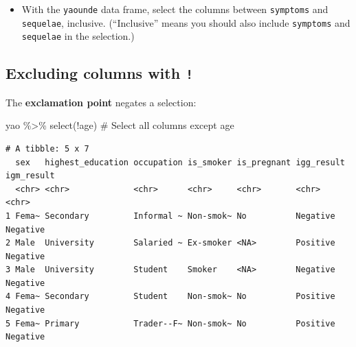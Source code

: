 \documentclass[
  letterpaper,
  DIV=11,
  numbers=noendperiod]{scrreprt}
\newenvironment{Shaded}{\begin{snugshade}}{\end{snugshade}}
\newcommand{\CommentTok}[1]{\textcolor[rgb]{0.37,0.37,0.37}{#1}}
\newcommand{\FunctionTok}[1]{\textcolor[rgb]{0.28,0.35,0.67}{#1}}
\newcommand{\NormalTok}[1]{\textcolor[rgb]{0.00,0.23,0.31}{#1}}
\newcommand{\SpecialCharTok}[1]{\textcolor[rgb]{0.37,0.37,0.37}{#1}}
\providecommand{\tightlist}{%
  \setlength{\itemsep}{0pt}\setlength{\parskip}{0pt}}\usepackage{longtable,booktabs,array}
\begin{document}
\begin{tcolorbox}[enhanced jigsaw, title=\textcolor{quarto-callout-tip-color}{\faLightbulb}\hspace{0.5em}{Practice}, colbacktitle=quarto-callout-tip-color!10!white, leftrule=.75mm, arc=.35mm, opacityback=0, bottomrule=.15mm, rightrule=.15mm, toptitle=1mm, breakable, toprule=.15mm, colback=white, coltitle=black, colframe=quarto-callout-tip-color-frame, bottomtitle=1mm, titlerule=0mm, left=2mm, opacitybacktitle=0.6]

\begin{itemize}
\tightlist
\item
  With the \texttt{yaounde} data frame, select the columns between
  \texttt{symptoms} and \texttt{sequelae}, inclusive. (``Inclusive''
  means you should also include \texttt{symptoms} and \texttt{sequelae}
  in the selection.)
\end{itemize}

\end{tcolorbox}

\subsection{\texorpdfstring{Excluding columns with
\texttt{!}}{Excluding columns with !}}\label{excluding-columns-with}

The \textbf{exclamation point} negates a selection:

\begin{Shaded}
\begin{Highlighting}[]
\NormalTok{yao }\SpecialCharTok{\%\textgreater{}\%} \FunctionTok{select}\NormalTok{(}\SpecialCharTok{!}\NormalTok{age) }\CommentTok{\# Select all columns except \textasciigrave{}age\textasciigrave{}}
\end{Highlighting}
\end{Shaded}

\begin{verbatim}
# A tibble: 5 x 7
  sex   highest_education occupation is_smoker is_pregnant igg_result igm_result
  <chr> <chr>             <chr>      <chr>     <chr>       <chr>      <chr>     
1 Fema~ Secondary         Informal ~ Non-smok~ No          Negative   Negative  
2 Male  University        Salaried ~ Ex-smoker <NA>        Positive   Negative  
3 Male  University        Student    Smoker    <NA>        Negative   Negative  
4 Fema~ Secondary         Student    Non-smok~ No          Positive   Negative  
5 Fema~ Primary           Trader--F~ Non-smok~ No          Positive   Negative  
\end{verbatim}
\end{document}
